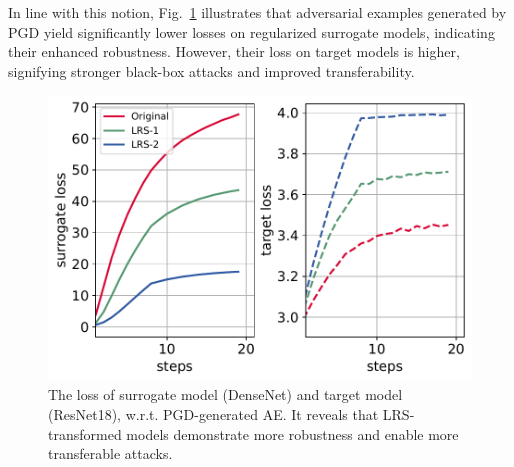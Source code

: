 \documentclass[letterpaper]{article} %
\theoremstyle{plain}
\theoremstyle{definition}
\newcommand{\fref}[1]{Fig.~\ref{#1}}
\begin{document}
In line with this notion, \fref{fig:loss} illustrates that adversarial examples generated by PGD yield significantly lower losses on regularized surrogate models, indicating their enhanced robustness. However, their loss on target models is higher, signifying stronger black-box attacks and improved transferability.

\begin{figure}[h!]
    \centering
    \includegraphics[width=\linewidth]{figs/loss.pdf}
    \caption{The loss of surrogate model (DenseNet) and target model (ResNet18), w.r.t. PGD-generated AE. It reveals that LRS-transformed models demonstrate more robustness and enable more transferable attacks.}
    \label{fig:loss}
\end{figure}
\end{document}
